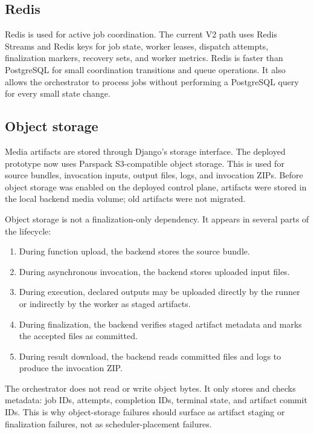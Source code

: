 \documentclass[12pt,a4paper]{report}
\begin{document}
\subsection{Redis}

Redis is used for active job coordination. The current V2 path uses Redis
Streams and Redis keys for job state, worker leases, dispatch attempts,
finalization markers, recovery sets, and worker metrics. Redis is faster than
PostgreSQL for small coordination transitions and queue operations. It also
allows the orchestrator to process jobs without performing a PostgreSQL query
for every small state change.

\subsection{Object storage}

Media artifacts are stored through Django's storage interface. The deployed
prototype now uses Parspack S3-compatible object storage. This is used for
source bundles, invocation inputs, output files, logs, and invocation ZIPs.
Before object storage was enabled on the deployed control plane, artifacts were
stored in the local backend media volume; old artifacts were not migrated.

Object storage is not a finalization-only dependency. It appears in several
parts of the lifecycle:

\begin{enumerate}[leftmargin=1.2cm]
  \item During function upload, the backend stores the source bundle.
  \item During asynchronous invocation, the backend stores uploaded input files.
  \item During execution, declared outputs may be uploaded directly by the runner or indirectly by the worker as staged artifacts.
  \item During finalization, the backend verifies staged artifact metadata and marks the accepted files as committed.
  \item During result download, the backend reads committed files and logs to produce the invocation ZIP.
\end{enumerate}

The orchestrator does not read or write object bytes. It only stores and checks
metadata: job IDs, attempts, completion IDs, terminal state, and artifact
commit IDs. This is why object-storage failures should surface as artifact
staging or finalization failures, not as scheduler-placement failures.
\end{document}
